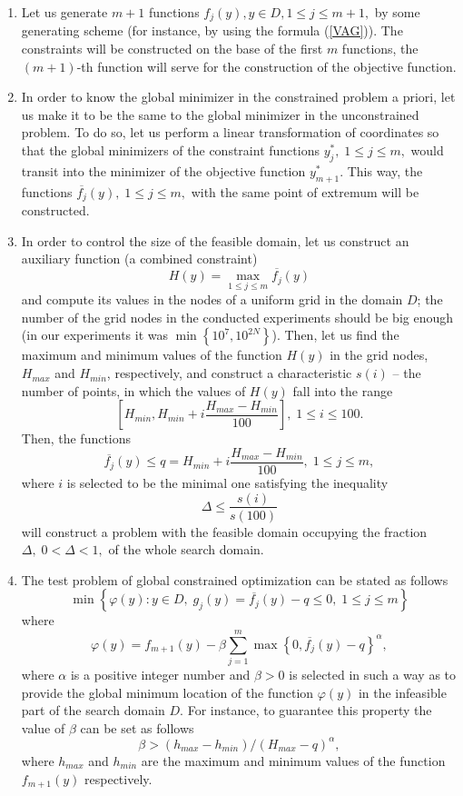 \documentclass{aip-cp}
\begin{document}
\begin{enumerate}
	\item Let us generate $m+1$ functions $f_j(y), y \in D, 1 \leq j \leq m+1,$ by some generating scheme (for instance, by using the formula (\ref{VAG})). The constraints will be constructed on the base of the first $m$ functions, the $(m+1)$-th function will serve for the construction of the objective function.
	\item In order to know the global minimizer in the constrained problem a priori, let us make it to be the same to the global minimizer in the unconstrained problem. To do so, let us perform a linear transformation of coordinates so that the global minimizers of the constraint functions $y_j^\ast, \; 1 \leq j \leq m,$ would transit into the minimizer of the objective function $y_{m+1}^\ast$. This way, the functions $\overline{f_j}(y), \; 1 \leq j \leq m,$ with the same point of extremum will be constructed.
		\item In order to control the size of the feasible domain, let us construct an auxiliary function (a combined constraint)
		\[
		H(y)=\max_{1 \leq j \leq m}{\overline{f_j}(y)}
		\]
and compute its values in the nodes of a uniform grid in the domain $D$; the number of the grid nodes in the conducted experiments should be big enough (in our experiments it was $\min \left\{10^7, 10^{2N} \right\}$). Then, let us find the maximum and minimum values of the function $H(y)$ in the grid nodes, $H_{max}$ and $H_{min}$, respectively, and construct a characteristic $s(i)$ -- the number of points, in which the values of $H(y)$ fall into the range 
\[
\left[H_{min},H_{min}+i\frac{H_{max}-H_{min}}{100}\right], \; 1 \leq i \leq 100 .
\]
Then, the functions 
\[
\overline{f_j}(y) \leq q = H_{min}+i\frac{H_{max}-H_{min}}{100}, \; 1 \leq j \leq m,
\]
where $i$ is selected to be the minimal one satisfying the inequality
\[
\Delta \leq \frac{s(i)}{s(100)}
\]
will construct a problem with the feasible domain occupying the fraction $\Delta, \; 0<\Delta<1,$ of the whole search domain.
\item 
The test problem of global constrained optimization can be stated as follows
\[
\min\left\{ \varphi(y):y \in D, \; g_j(y)= \overline{f_j}(y)-q \leq 0, \; 1 \leq j \leq m \right\}
\]
where 
\[
\varphi(y) = f_{m+1}(y)-\beta\sum_{j=1}^m\max\left\{0,\overline{f_j}(y) -q \right\}^\alpha,
\]
where $\alpha$ is a positive integer number and $\beta>0$ is selected in such a way as to provide the global minimum location of the function $\varphi(y)$ in the infeasible part of the search domain $D$. For instance, to guarantee this property the value of $\beta$ can be set as follows
\[
\beta>(h_{max}-h_{min})/(H_{max}-q)^\alpha,
\]
where $h_{max}$ and $h_{min}$ are the maximum and minimum values of the function $f_{m+1}(y)$ respectively.
\end{enumerate}
\end{document}
